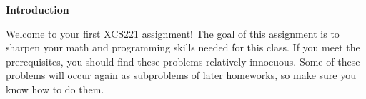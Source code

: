 {\bf Introduction}

Welcome to your first XCS221 assignment! The goal of this assignment is to
sharpen your math and programming skills needed for this class. If you meet the
prerequisites, you should find these problems relatively innocuous. Some of
these problems will occur again as subproblems of later homeworks, so make sure
you know how to do them.